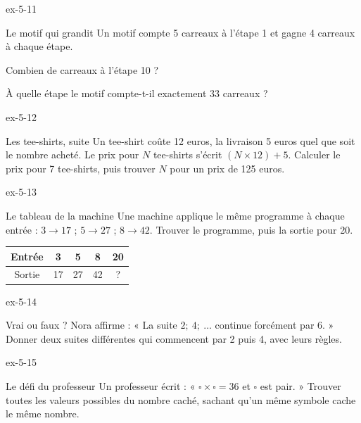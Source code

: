 \begin{blocLivre}{ex-5-11}\begin{exercice}[3]{Le motif qui grandit}
Un motif compte 5 carreaux à l’étape 1 et gagne 4 carreaux à chaque étape.\begin{questions}
\item Combien de carreaux à l’étape 10 ?
\item À quelle étape le motif compte-t-il exactement 33 carreaux ?
\end{questions}
\label{fig-ex-5-11}
\end{exercice}\end{blocLivre}
\begin{blocLivre}{ex-5-12}\begin{exercice}[3]{Les tee-shirts, suite}
Un tee-shirt coûte 12 euros, la livraison 5 euros quel que soit le nombre acheté. Le prix pour $N$ tee-shirts s’écrit $(N\times12)+5$. Calculer le prix pour 7 tee-shirts, puis trouver $N$ pour un prix de 125 euros.
\end{exercice}\end{blocLivre}
\begin{blocLivre}{ex-5-13}\begin{exercice}[3]{Le tableau de la machine}
Une machine applique le même programme à chaque entrée : $3\to17$ ; $5\to27$ ; $8\to42$. Trouver le programme, puis la sortie pour 20.\begin{center}\renewcommand{\arraystretch}{1.35}\begin{tabular}{c|cccc}\toprule
Entrée & 3 & 5 & 8 & 20\\\midrule
Sortie & 17 & 27 & 42 & ?\\
\bottomrule\end{tabular}\end{center}
\end{exercice}\end{blocLivre}
\begin{blocLivre}{ex-5-14}\begin{exercice}[3]{Vrai ou faux ?}
Nora affirme : « La suite $2 ;\ 4 ;\ \ldots$ continue forcément par 6. » Donner deux suites différentes qui commencent par 2 puis 4, avec leurs règles.
\end{exercice}\end{blocLivre}
\begin{blocLivre}{ex-5-15}\begin{exercice}[3]{Le défi du professeur}
Un professeur écrit : « $\square\times\square=36$ et $\square$ est pair. » Trouver toutes les valeurs possibles du nombre caché, sachant qu’un même symbole cache le même nombre.
\end{exercice}\end{blocLivre}

\clearpage
